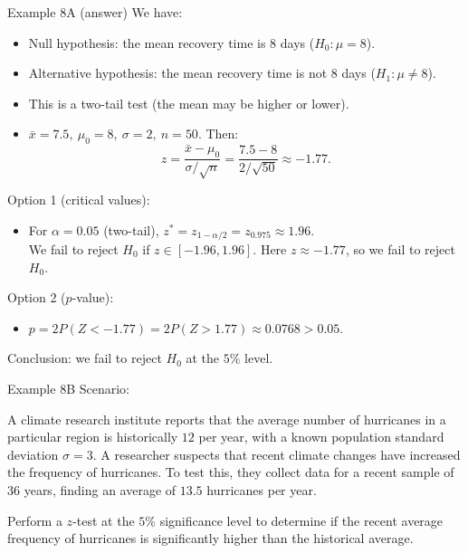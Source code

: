 \documentclass[t,8pt]{beamer}
\begin{document}
\begin{frame}{Example 8A (answer)}
	We have:
	\begin{itemize}
		\item Null hypothesis: the mean recovery time is $8$ days ($H_0:\mu=8$).
		\item Alternative hypothesis: the mean recovery time is not $8$ days ($H_1:\mu\neq 8$).
		\item This is a two-tail test (the mean may be higher or lower).
		\item $\bar x=7.5,\ \mu_0=8,\ \sigma=2,\ n=50$. Then:
		\[
		z=\frac{\bar x-\mu_0}{\sigma/\sqrt n}
		=\frac{7.5-8}{2/\sqrt{50}}
		\approx -1.77.
		\]
	\end{itemize}
	Option 1 (critical values):
	\begin{itemize}
		\item For $\alpha=0.05$ (two-tail), $z^* = z_{1-\alpha/2} = z_{0.975}\approx 1.96$.\\
		We fail to reject $H_0$ if $z\in[-1.96,1.96]$. Here $z\approx -1.77$, so we fail to reject $H_0$.
	\end{itemize}
	Option 2 ($p$-value):
	\begin{itemize}
		\item $p = 2P(Z<-1.77)=2P(Z>1.77)\approx 0.0768>0.05$.
	\end{itemize}
	Conclusion: we fail to reject $H_0$ at the $5\%$ level.
\end{frame}

\begin{frame}{Example 8B}
	Scenario: \par
	A climate research institute reports that the average number of hurricanes in a particular region is historically $12$ per year, with a known population standard deviation $\sigma=3$. A researcher suspects that recent climate changes have increased the frequency of hurricanes. To test this, they collect data for a recent sample of $36$ years, finding an average of $13.5$ hurricanes per year. \par
	Perform a $z$-test at the $5\%$ significance level to determine if the recent average frequency of hurricanes is significantly higher than the historical average.
\end{frame}
\end{document}
